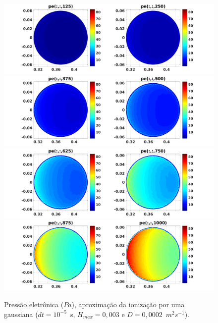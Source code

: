 \documentclass[12pt,oneside,a4paper]{abntex2}
\begin{document}
\begin{figure}[H]
\centering
\includegraphics[scale=0.5]{../SImulacao_breakdown/PDE/petod1B6.png}  
\includegraphics[scale=0.5]{../SImulacao_breakdown/PDE/petod2B6.png} 
\includegraphics[scale=0.5]{../SImulacao_breakdown/PDE/petod3B6.png} 
\includegraphics[scale=0.5]{../SImulacao_breakdown/PDE/petod4B6.png} 
\caption{Pressão eletrônica ($Pa$), aproximação da ionização por uma gaussiana ($dt=10^{-5}$\ s, $H_{max} = 0,003$ e $D=0,0002$\ $m^2s^{-1}$).}
\label{pressaoB}
\end{figure}
\end{document}
